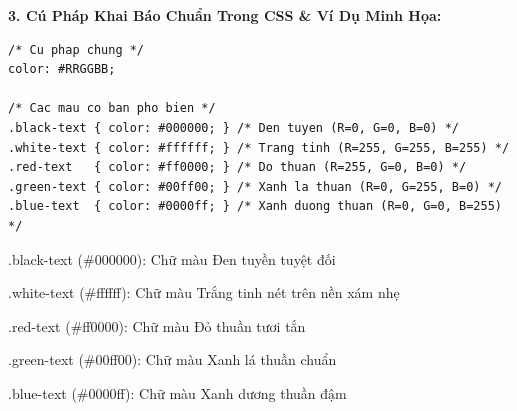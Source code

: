 \textbf{3. Cú Pháp Khai Báo Chuẩn Trong CSS \& Ví Dụ Minh Họa:}
\begin{codeWindow}
\begin{lstlisting}[language=CSS3]
/* Cu phap chung */
color: #RRGGBB;

/* Cac mau co ban pho bien */
.black-text { color: #000000; } /* Den tuyen (R=0, G=0, B=0) */
.white-text { color: #ffffff; } /* Trang tinh (R=255, G=255, B=255) */
.red-text   { color: #ff0000; } /* Do thuan (R=255, G=0, B=0) */
.green-text { color: #00ff00; } /* Xanh la thuan (R=0, G=255, B=0) */
.blue-text  { color: #0000ff; } /* Xanh duong thuan (R=0, G=0, B=255) */
\end{lstlisting}
\end{codeWindow}

\begin{browserWindow}
\vspace{2pt}
\begin{tcolorbox}[
    enhanced,
    colback=white,
    colframe=gray!30,
    arc=4pt, boxrule=0.6pt,
    top=8pt, bottom=8pt, left=10pt, right=10pt
]
  \begin{tcolorbox}[colback=black, colframe=black, arc=3pt, boxrule=0.4pt, top=4pt, bottom=4pt, left=8pt, right=8pt, fontupper=\sffamily\bfseries\color{white}]
    .black-text (\#000000): Chữ màu Đen tuyền tuyệt đối
  \end{tcolorbox}
  \vspace{3pt}
  \begin{tcolorbox}[colback=white, colframe=gray!40, arc=3pt, boxrule=0.4pt, top=4pt, bottom=4pt, left=8pt, right=8pt, fontupper=\sffamily\bfseries\color{black}]
    .white-text (\#ffffff): Chữ màu Trắng tinh nét trên nền xám nhẹ
  \end{tcolorbox}
  \vspace{3pt}
  \begin{tcolorbox}[colback=red!10, colframe=red!60, arc=3pt, boxrule=0.4pt, top=4pt, bottom=4pt, left=8pt, right=8pt, fontupper=\sffamily\bfseries\color{red!80!black}]
    .red-text (\#ff0000): Chữ màu Đỏ thuần tươi tắn
  \end{tcolorbox}
  \vspace{3pt}
  \begin{tcolorbox}[colback=green!10, colframe=green!60!black, arc=3pt, boxrule=0.4pt, top=4pt, bottom=4pt, left=8pt, right=8pt, fontupper=\sffamily\bfseries\color{green!50!black}]
    .green-text (\#00ff00): Chữ màu Xanh lá thuần chuẩn
  \end{tcolorbox}
  \vspace{3pt}
  \begin{tcolorbox}[colback=blue!10, colframe=blue!60, arc=3pt, boxrule=0.4pt, top=4pt, bottom=4pt, left=8pt, right=8pt, fontupper=\sffamily\bfseries\color{blue!80!black}]
    .blue-text (\#0000ff): Chữ màu Xanh dương thuần đậm
  \end{tcolorbox}
\end{tcolorbox}
\end{browserWindow}

